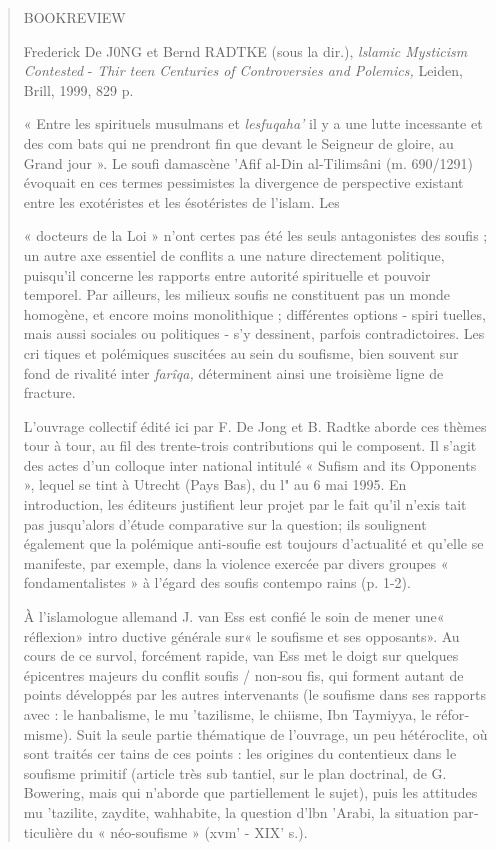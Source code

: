 \begin{quote}
BOOKREVIEW

Frederick De J0NG et Bernd RADTKE (sous la dir.), \emph{lslamic
Mysticism Contested} - \emph{Thir­ teen Centuries of Controversies and
Polemics,} Leiden, Brill, 1999, 829 p.

« Entre les spirituels musulmans et \emph{lesfuqaha'} il y a une lutte
incessante et des com­ bats qui ne prendront fin que devant le Seigneur
de gloire, au Grand jour ». Le soufi damascène 'Afif al-Din al-Tilimsâni
(m. 690/1291) évoquait en ces termes pessimistes la divergence de
perspective existant entre les exotéristes et les ésotéristes de
l'islam. Les

« docteurs de la Loi » n'ont certes pas été les seuls antagonistes des
soufis ; un autre axe essentiel de conflits a une nature directement
politique, puisqu'il concerne les rapports entre autorité spirituelle et
pouvoir temporel. Par ailleurs, les milieux soufis ne constituent pas un
monde homogène, et encore moins monolithique ; différentes options -
spiri­ tuelles, mais aussi sociales ou politiques - s'y dessinent,
parfois contradictoires. Les cri­ tiques et polémiques suscitées au sein
du soufisme, bien souvent sur fond de rivalité inter­ \emph{farîqa,}
déterminent ainsi une troisième ligne de fracture.

L'ouvrage collectif édité ici par F. De Jong et B. Radtke aborde ces
thèmes tour à tour, au fil des trente-trois contributions qui le
composent. Il s'agit des actes d'un colloque inter­ national intitulé «
Sufism and its Opponents », lequel se tint à Utrecht (Pays Bas), du l"
au 6 mai 1995. En introduction, les éditeurs justifient leur projet par
le fait qu'il n'exis­ tait pas jusqu'alors d'étude comparative sur la
question; ils soulignent également que la polémique anti-soufie est
toujours d'actualité et qu'elle se manifeste, par exemple, dans la
violence exercée par divers groupes « fondamentalistes » à l'égard des
soufis contempo­ rains (p. 1-2).

À l'islamologue allemand J. van Ess est confié le soin de mener une«
réflexion» intro­ ductive générale sur« le soufisme et ses opposants».
Au cours de ce survol, forcément rapide, van Ess met le doigt sur
quelques épicentres majeurs du conflit soufis / non-sou­ fis, qui
forment autant de points développés par les autres intervenants (le
soufisme dans ses rapports avec : le hanbalisme, le mu 'tazilisme, le
chiisme, Ibn Taymiyya, le réfor­ misme). Suit la seule partie thématique
de l'ouvrage, un peu hétéroclite, où sont traités cer­ tains de ces
points : les origines du contentieux dans le soufisme primitif (article
très sub­ tantiel, sur le plan doctrinal, de G. Bowering, mais qui
n'aborde que partiellement le sujet), puis les attitudes mu 'tazilite,
zaydite, wahhabite, la question d'lbn 'Arabi, la situation par­
ticulière du « néo-soufisme » (xvm' - XIX' s.).


\end{quote}
